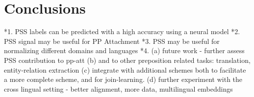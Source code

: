 \chapter{Conclusions}

*1. PSS labels can be predicted with a high accuracy using a neural model
*2. PSS signal may be useful for PP Attachment
*3. PSS may be useful for normalizing different domains and languages
*4. (a) future work - further assess PSS contribution to pp-att
(b) and to other preposition related tasks: translation, entity-relation extraction
(c) integrate with additional schemes both to facilitate a more complete scheme, and for join-learning.
(d) further experiment with the cross lingual setting - better alignment, more data, multilingual embeddings